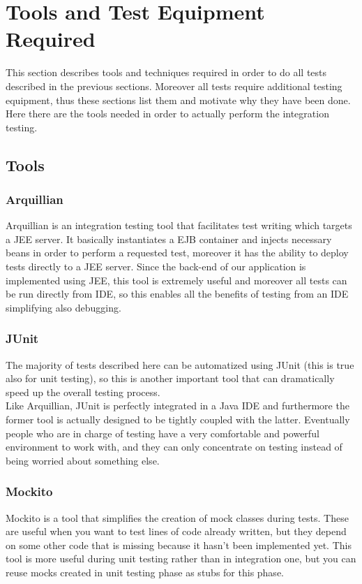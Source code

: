 \newpage
\section{Tools and Test Equipment Required}
This section describes tools and techniques required in order to do all tests described in the previous sections. Moreover all tests require additional testing equipment, thus these sections list them and motivate why they have been done. \\
Here there are the tools needed in order to actually perform the integration testing.

\subsection{Tools}

\subsubsection{Arquillian}
Arquillian is an integration testing tool that facilitates test writing which targets a JEE server. It basically instantiates a EJB container and injects necessary beans in order to perform a requested test, moreover it has the ability to deploy tests directly to a JEE server. Since the back-end of our application is implemented using JEE, this tool is extremely useful and moreover all tests can be run directly from IDE, so this enables all the benefits of testing from an IDE simplifying also debugging.

\subsubsection{JUnit}
The majority of tests described here can be automatized using JUnit (this is true also for unit testing), so this is another important tool that can dramatically speed up the overall testing process. \\ Like Arquillian, JUnit is perfectly integrated in a Java IDE and furthermore the former tool is actually designed to be tightly coupled with the latter. Eventually people who are in charge of testing have a very comfortable and powerful environment to work with, and they can only concentrate on testing instead of being worried about something else. 

\subsubsection{Mockito}
Mockito is a tool that simplifies the creation of mock classes during tests. These are useful when you want to test lines of code already written, but they depend on some other code that is missing because it hasn't been implemented yet. This tool is more useful during unit testing rather than in integration one, but you can reuse mocks created in unit testing phase as stubs for this phase.

